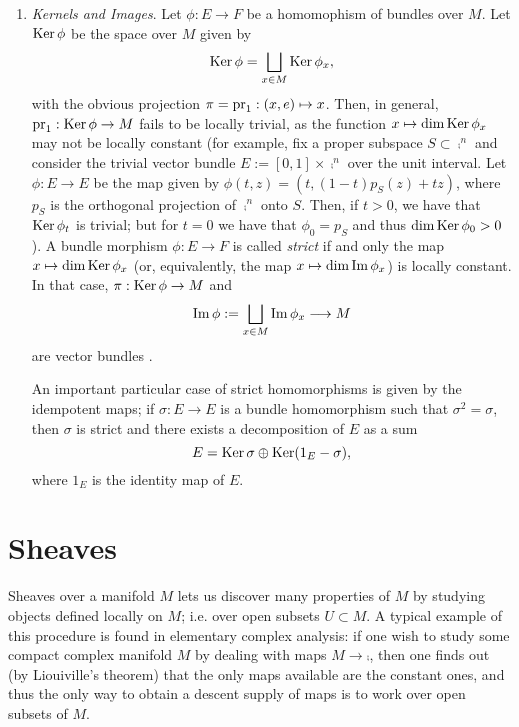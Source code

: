 \begin{enumerate}
In particular, if $F=\comp$ is the trivial line bundle, then the
previous result provides an isomorphism
$E^*\cong \operatorname{Hom}(E,\comp )$.

\begin{proof}
  The map $E^*\otimes F \to \operatorname{Hom}(E,F)$ given by the
  assignment
$$\phi \otimes v \longmapsto (\phi_e:u\mapsto \phi (u)v)$$
is a linear isomorphism.
\end{proof}

\item \emph{Kernels and Images}. Let $\phi :E\to F$ be a homomophism
  of bundles over $M$. Let $\operatorname{Ker}\phi$ be the space over $M$
  given by
$$\operatorname{Ker}\phi =\bigsqcup_{x\in M}\operatorname{Ker}\phi_x,$$
with the obvious projection $\pi =\operatorname{pr}_1:(x,e)\mapsto x$. Then, in
general, $\operatorname{pr}_1:\operatorname{Ker}\phi \to M$ fails to be locally trivial, as
the function $x\mapsto \dim \operatorname{Ker}\phi_x$ may not be locally
constant (for example, fix a proper subspace $S\subset \comp^n$ and
consider the trivial vector bundle $E:=[0,1]\times \comp^n$ over the
unit interval. Let $\phi :E\to E$ be the map given by
$\phi (t,z)=(t,(1-t)p_S(z)+tz)$, where $p_S$ is the orthogonal
projection of $\comp^n$ onto $S$. Then, if $t>0$, we have that
$\operatorname{Ker}\phi_t$ is trivial; but for $t=0$ we have that $\phi_0=p_S$
and thus $\dim \operatorname{Ker}\phi_0 >0$).  A bundle morphism
$\phi :E\to F$ is called \emph{strict} if and only the map
$x\mapsto \dim \operatorname{Ker}\phi_x$ (or, equivalently, the map
$x\mapsto \dim \operatorname{Im}\phi_x$) is locally constant. In that case,
$\pi :\operatorname{Ker}\phi \to M$ and
$$\operatorname{Im}\phi :=\bigsqcup_{x\in M}\operatorname{Im}\phi_x\longrightarrow M$$
are vector bundles \cite{atiyah:_k}.

An important particular case of strict homomorphisms is given by the
idempotent maps; if $\sigma :E\to E$ is a bundle homomorphism such
that $\sigma^2=\sigma$, then $\sigma$ is strict and there exists a
decomposition of $E$ as a sum
$$E=\operatorname{Ker}\sigma \oplus \operatorname{Ker}(1_E-\sigma),$$
where $1_E$ is the identity map of $E$.
\end{enumerate}



\section{Sheaves}

Sheaves over a manifold $M$ lets us discover many properties  of $M$ by studying objects defined locally on $M$; i.e. over open subsets $U\subset M$. A typical example of this procedure is found in elementary complex analysis: if one wish to study some compact complex manifold $M$ by dealing with maps $M\to \comp$, then one finds out (by Liouiville's theorem) that the only maps available are the constant ones, and thus the only way to obtain a descent supply of maps is to work over open subsets of $M$. 

